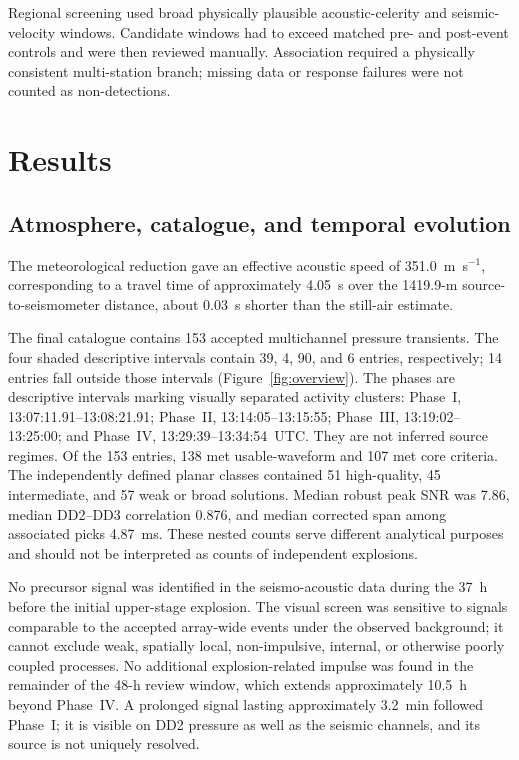 \documentclass[]{seismica}
\begin{document}
Regional screening used broad physically plausible acoustic-celerity and
seismic-velocity windows. Candidate windows had to exceed matched pre- and
post-event controls and were then reviewed manually. Association required a
physically consistent multi-station branch; missing data or response failures
were not counted as non-detections.

\section{Results}
\label{sec:results}

\subsection{Atmosphere, catalogue, and temporal evolution}
\label{sec:temporal_evolution}

The meteorological reduction gave an effective acoustic speed of
351.0~m~s$^{-1}$, corresponding to a travel time of approximately 4.05~s over
the 1419.9-m source-to-seismometer distance, about 0.03~s shorter than the
still-air estimate.

The final catalogue contains 153 accepted multichannel pressure transients.
The four shaded descriptive intervals contain 39, 4, 90, and 6 entries,
respectively; 14 entries fall outside those intervals
(Figure~\ref{fig:overview}). The phases are descriptive intervals marking
visually separated activity clusters: Phase~I, 13:07:11.91--13:08:21.91;
Phase~II, 13:14:05--13:15:55; Phase~III, 13:19:02--13:25:00; and Phase~IV,
13:29:39--13:34:54~UTC. They are not inferred source regimes. Of the 153
entries, 138 met usable-waveform and 107 met core
criteria. The independently defined planar classes contained 51 high-quality,
45 intermediate, and 57 weak or broad solutions. Median robust peak SNR was
7.86, median DD2--DD3 correlation 0.876, and median corrected span among
associated picks 4.87~ms. These nested counts serve different analytical
purposes and should not be interpreted as counts of independent explosions.

No precursor signal was identified in the seismo-acoustic data during the
37~h before the initial upper-stage explosion. The visual screen was sensitive
to signals comparable to the accepted array-wide events
under the observed background; it cannot exclude weak, spatially local,
non-impulsive, internal, or otherwise poorly coupled processes. No additional
explosion-related impulse was found in the remainder of the 48-h review window,
which extends approximately 10.5~h beyond Phase~IV. A prolonged signal lasting
approximately 3.2~min followed Phase~I; it is visible on DD2 pressure as well
as the seismic channels, and its source is not uniquely resolved.
\end{document}
